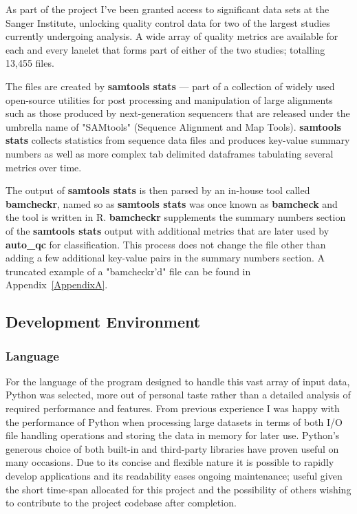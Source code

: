 As part of the project I've been granted access to significant data sets at the
Sanger Institute, unlocking quality control data for two of the largest studies
currently undergoing analysis. A wide array of quality metrics are available for
each and every lanelet that forms part of either of the two studies; totalling
13,455 files.


The files are created by \textbf{samtools stats} --- part of a collection of
widely used open-source utilities for post processing and manipulation of large
alignments such as those produced by next-generation sequencers that are
released under the umbrella name of "SAMtools"\citep{samtools} (Sequence Alignment and Map
Tools). \textbf{samtools stats} collects statistics from sequence data files %
and produces key-value summary numbers as well as more complex tab delimited
dataframes tabulating several metrics over time.

The output of \textbf{samtools stats} is then parsed by an in-house tool called
\textbf{bamcheckr}, named so as \textbf{samtools stats} was once known as
\textbf{bamcheck} and the tool is written in R. \textbf{bamcheckr} supplements
the summary numbers section of the \textbf{samtools stats} output with
additional metrics that are later used by \textbf{auto\_qc} for classification.
This process does not change the file other than adding a few additional
key-value pairs in the summary numbers section. A truncated example of a
"bamcheckr'd" file can be found in Appendix~\ref{AppendixA}.


\subsection{Development Environment}
\subsubsection{Language}
For the language of the program designed to handle this vast array of input
data, Python was selected, more out of personal taste rather than a
detailed analysis of required performance and features. From previous experience
I was happy with the performance of Python when processing large datasets in
terms of both I/O file handling operations and storing the data in memory for
later use. Python's generous choice of both built-in and third-party libraries
have proven useful on many occasions. Due to its concise and flexible nature it
is possible to rapidly develop applications and its readability eases ongoing
maintenance; useful given the short time-span allocated for this project and the
possibility of others wishing to contribute to the project codebase after
completion.

